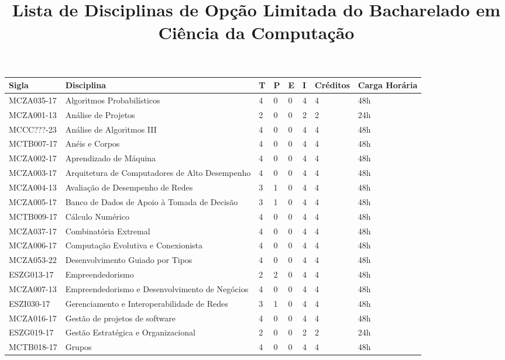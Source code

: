 \documentclass[a4paper]{article}
\title{Lista de Disciplinas de Opção Limitada do Bacharelado em Ciência da Computação}
\author{}
\date{}
\begin{document}
\maketitle

\begin{longtable}{|l|l|llll|l|l|}\hline\endhead\hline\endfoot
\textbf{Sigla} & \textbf{Disciplina} & \textbf{T} & \textbf{P} & \textbf{E} & \textbf{I} & \textbf{Créditos} & \textbf{Carga Horária} \\ \hline\hline
%
MCZA035-17 & Algoritmos Probabilísticos & 4 & 0 & 0 & 4 & 4 & 48h \\
MCZA001-13 & Análise de Projetos & 2 & 0 & 0 & 2 & 2 & 24h \\
MCCC???-23 & Análise de Algoritmos III & 4 & 0 & 0 & 4 & 4 & 48h \\
MCTB007-17 & Anéis e Corpos & 4 & 0 & 0 & 4 & 4 & 48h \\
MCZA002-17 & Aprendizado de Máquina & 4 & 0 & 0 & 4 & 4 & 48h \\
MCZA003-17 & Arquitetura de Computadores de Alto Desempenho & 4 & 0 & 0 & 4 & 4 & 48h \\
MCZA004-13 & Avaliação de Desempenho de Redes & 3 & 1 & 0 & 4 & 4 & 48h \\
MCZA005-17 & Banco de Dados de Apoio à Tomada de Decisão & 3 & 1 & 0 & 4 & 4 & 48h \\
MCTB009-17 & Cálculo Numérico & 4 & 0 & 0 & 4 & 4 & 48h \\
MCZA037-17 & Combinatória Extremal & 4 & 0 & 0 & 4 & 4 & 48h \\
MCZA006-17 & Computação Evolutiva e Conexionista & 4 & 0 & 0 & 4 & 4 & 48h \\
MCZA053-22 & Desenvolvimento Guiado por Tipos & 4 & 0 & 0 & 4 & 4 & 48h \\
ESZG013-17 & Empreendedorismo & 2 & 2 & 0 & 4 & 4 & 48h \\
MCZA007-13 & Empreendedorismo e Desenvolvimento de Negócios & 4 & 0 & 0 & 4 & 4 & 48h \\
ESZI030-17 & Gerenciamento e Interoperabilidade de Redes & 3 & 1 & 0 & 4 & 4 & 48h \\
MCZA016-17 & Gestão de projetos de software & 4 & 0 & 0 & 4 & 4 & 48h \\
ESZG019-17 & Gestão Estratégica e Organizacional & 2 & 0 & 0 & 2 & 2 & 24h \\
MCTB018-17 & Grupos & 4 & 0 & 0 & 4 & 4 & 48h \\

\end{longtable}
\end{document}
